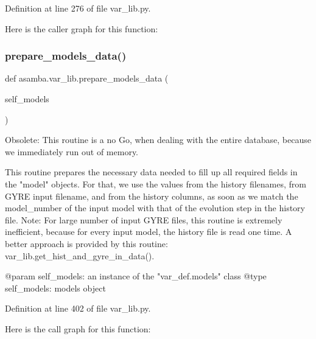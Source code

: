 Definition at line 276 of file var\+\_\+lib.\+py.

Here is the caller graph for this function\+:
\mbox{\label{namespaceasamba_1_1var__lib_ac3a34f468d31f54f0d29486fbd1d3ab5}} 
\subsubsection{\texorpdfstring{prepare\+\_\+models\+\_\+data()}{prepare\_models\_data()}}
{\footnotesize\ttfamily def asamba.\+var\+\_\+lib.\+prepare\+\_\+models\+\_\+data (\begin{DoxyParamCaption}\item[{}]{self\+\_\+models }\end{DoxyParamCaption})}

\begin{DoxyVerb}Obsolete: This routine is a no Go, when dealing with the entire database, because we immediately 
run out of memory.

This routine prepares the necessary data needed to fill up all required fields in the "model" objects.
For that, we use the values from the history filenames, from GYRE input filename, and from the history
columns, as soon as we match the model_number of the input model with that of the evolution step in
the history file.
Note: For large number of input GYRE files, this routine is extremely inefficient, because for every 
input model, the history file is read one time. A better approach is provided by this routine:
var_lib.get_hist_and_gyre_in_data().

@param self_models: an instance of the "var_def.models" class 
@type self_models: models object\end{DoxyVerb}
 

Definition at line 402 of file var\+\_\+lib.\+py.

Here is the call graph for this function\+:
